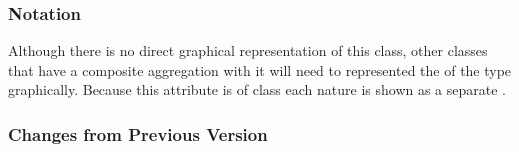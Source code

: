
\subsubsection{Notation}

Although there is no direct graphical representation of this class,
other classes that have a composite aggregation with it will need to
represented the  of the type graphically. Because this
attribute is of class  each nature is shown
as a separate . 





\subsubsection{Changes from Previous Version}

